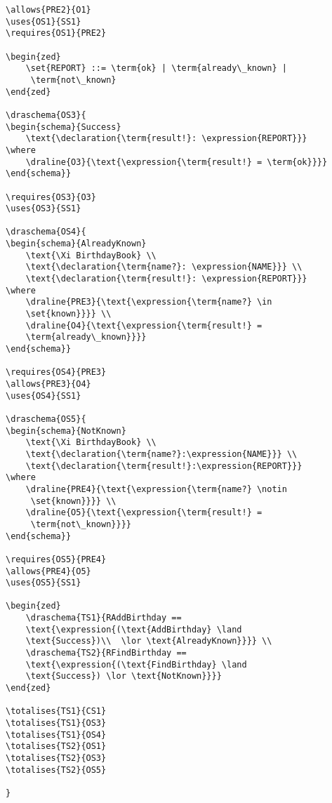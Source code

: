 \begin{verbatim}
\allows{PRE2}{O1}
\uses{OS1}{SS1}
\requires{OS1}{PRE2}

\begin{zed} 
    \set{REPORT} ::= \term{ok} | \term{already\_known} |
     \term{not\_known}
\end{zed}

\draschema{OS3}{
\begin{schema}{Success}
    \text{\declaration{\term{result!}: \expression{REPORT}}}
\where
    \draline{O3}{\text{\expression{\term{result!} = \term{ok}}}}
\end{schema}}

\requires{OS3}{O3}
\uses{OS3}{SS1}

\draschema{OS4}{
\begin{schema}{AlreadyKnown}
    \text{\Xi BirthdayBook} \\
    \text{\declaration{\term{name?}: \expression{NAME}}} \\
    \text{\declaration{\term{result!}: \expression{REPORT}}}
\where
    \draline{PRE3}{\text{\expression{\term{name?} \in
    \set{known}}}} \\
    \draline{O4}{\text{\expression{\term{result!} =
    \term{already\_known}}}}
\end{schema}}

\requires{OS4}{PRE3}
\allows{PRE3}{O4}
\uses{OS4}{SS1}

\draschema{OS5}{
\begin{schema}{NotKnown}
    \text{\Xi BirthdayBook} \\
    \text{\declaration{\term{name?}:\expression{NAME}}} \\
    \text{\declaration{\term{result!}:\expression{REPORT}}}
\where
    \draline{PRE4}{\text{\expression{\term{name?} \notin
     \set{known}}}} \\
    \draline{O5}{\text{\expression{\term{result!} =
     \term{not\_known}}}}
\end{schema}}

\requires{OS5}{PRE4}
\allows{PRE4}{O5}
\uses{OS5}{SS1}

\begin{zed} 
    \draschema{TS1}{RAddBirthday == 
    \text{\expression{(\text{AddBirthday} \land 
    \text{Success})\\  \lor \text{AlreadyKnown}}}} \\
    \draschema{TS2}{RFindBirthday == 
    \text{\expression{(\text{FindBirthday} \land 
    \text{Success}) \lor \text{NotKnown}}}} 
\end{zed}

\totalises{TS1}{CS1}
\totalises{TS1}{OS3}
\totalises{TS1}{OS4}
\totalises{TS2}{OS1}
\totalises{TS2}{OS3}
\totalises{TS2}{OS5}

}

\end{verbatim}